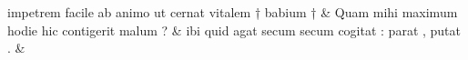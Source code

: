\documentclass[12pt,onecolumn,twoside,a4paper]{memoir}
\begin{document}
\begin{pairs}
\begin{Leftside}
                              impetrem
                              facile
                              ab
                              animo
                              ut
                              cernat
                              vitalem
                              †
                              babium
                              † \&
                         \stanza {}
                     Quam
                              mihi
                              maximum
                              hodie
                              hic
                              contigerit
                              malum
                              ? \&
                         \stanza {}
                     ibi
                              quid
                              agat
                              secum
                              {secum}
                              cogitat
                              :
                              parat
                              ,
                              putat
                              . \&
                     
                  \endnumbering
		\end{Leftside}
                  \begin{Rightside}
			\beginnumbering
			\numberstanzafalse
                     

\end{Rightside}
\end{pairs}
\end{document}
